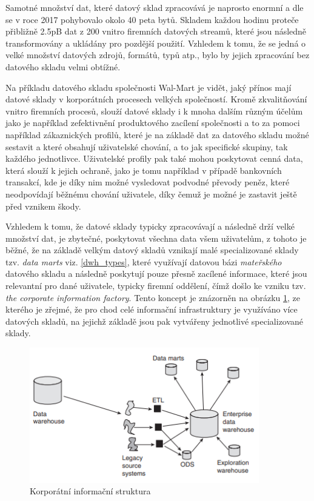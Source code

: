 \documentclass[
  digital,     %
  twoside,     %
  lof,         %
  lot,         %
]{fithesis4}
\begin{document}
Samotné množství dat, které datový sklad zpracovává je naprosto enormní a dle \citeauthor{Marr2017} se v roce 2017 pohybovalo okolo 40 peta bytů. Skladem každou hodinu proteče přibližně 2.5pB dat z 200 vnitro firemních datových streamů, které jsou následně transformovány a ukládány pro pozdější použití.\parencite{Marr2017} Vzhledem k tomu, že se jedná o velké množství datových zdrojů, formátů, typů atp., bylo by jejich zpracování bez datového skladu velmi obtížné.

Na příkladu datového skladu společnosti Wal-Mart je vidět, jaký přínos mají datové sklady v korporátních procesech velkých společností. Kromě zkvalitňování vnitro firemních procesů, slouží datové sklady i k mnoha dalším různým účelům jako je například zefektivnění produktového zacílení společnosti a to za pomoci například zákaznických profilů, které je na základě dat za datového skladu možné sestavit a které obsahují uživatelské chování, a to jak specifické skupiny, tak každého jednotlivce. Uživatelské profily pak také mohou poskytovat cenná data, která slouží k jejich ochraně, jako je tomu například v případě bankovních transakcí, kde je díky nim možné vysledovat podvodné převody peněz, které neodpovídají běžnému chování uživatele, díky čemuž je možné je zastavit ještě před vznikem škody.\parencite{Inmon2008}

Vzhledem k tomu, že datové sklady typicky zpracovávají a následně drží velké množství dat, je zbytečné, poskytovat všechna data všem uživatelům, z tohoto je běžné, že na základě velkým datový skladů vznikají malé specializované sklady tzv. \emph{data marts} viz. \ref{dwh_types}, které využívají datovou bázi \emph{mateřského} datového skladu a následně poskytují pouze přesně zacílené informace, které jsou relevantní pro dané uživatele, typicky firemní oddělení, čímž došlo ke vzniku tzv. \emph{the corporate information factory}.\parencite{Inmon2021} Tento koncept je znázorněn na obrázku \ref{fig:data_marts_schema}, ze kterého je zřejmé, že pro chod celé informační infrastruktury je využíváno více datových skladů, na jejichž základě jsou pak vytvářeny jednotlivé specializované sklady.

\begin{figure}[h]
  \begin{center}
          \includegraphics[width=10cm]{img/data_marts_schema.png}
  \end{center}
  \caption{Korporátní informační struktura \parencite[s.12]{Inmon2008}}
  \label{fig:data_marts_schema}
\end{figure}  
\end{document}
